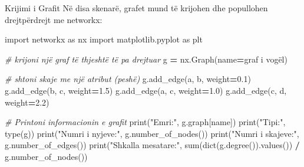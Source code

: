 \documentclass[
  ignorenonframetext,
]{beamer}
\newenvironment{Shaded}{\begin{snugshade}}{\end{snugshade}}
\newcommand{\BuiltInTok}[1]{#1}
\newcommand{\CommentTok}[1]{\textcolor[rgb]{0.56,0.35,0.01}{\textit{#1}}}
\newcommand{\FloatTok}[1]{\textcolor[rgb]{0.00,0.00,0.81}{#1}}
\newcommand{\ImportTok}[1]{#1}
\newcommand{\NormalTok}[1]{#1}
\newcommand{\OperatorTok}[1]{\textcolor[rgb]{0.81,0.36,0.00}{\textbf{#1}}}
\newcommand{\StringTok}[1]{\textcolor[rgb]{0.31,0.60,0.02}{#1}}
\begin{document}
\begin{frame}[fragile]{Krijimi i Grafit}
\protect\hypertarget{krijimi-i-grafit-1}{}
Në disa skenarë, grafet mund të krijohen dhe popullohen drejtpërdrejt me
networkx:


\begin{Shaded}
\begin{Highlighting}[]
\ImportTok{import}\NormalTok{ networkx }\ImportTok{as}\NormalTok{ nx}
\ImportTok{import}\NormalTok{ matplotlib.pyplot }\ImportTok{as}\NormalTok{ plt}

\CommentTok{\# krijoni një graf të thjeshtë të pa drejtuar}
\NormalTok{g }\OperatorTok{=}\NormalTok{ nx.Graph(name}\OperatorTok{=}\StringTok{\textquotesingle{}graf i vogël\textquotesingle{}}\NormalTok{)}

\CommentTok{\# shtoni skaje me një atribut (peshë)}
\NormalTok{g.add\_edge(}\StringTok{\textquotesingle{}a\textquotesingle{}}\NormalTok{, }\StringTok{\textquotesingle{}b\textquotesingle{}}\NormalTok{, weight}\OperatorTok{=}\FloatTok{0.1}\NormalTok{)}
\NormalTok{g.add\_edge(}\StringTok{\textquotesingle{}b\textquotesingle{}}\NormalTok{, }\StringTok{\textquotesingle{}c\textquotesingle{}}\NormalTok{, weight}\OperatorTok{=}\FloatTok{1.5}\NormalTok{)}
\NormalTok{g.add\_edge(}\StringTok{\textquotesingle{}a\textquotesingle{}}\NormalTok{, }\StringTok{\textquotesingle{}c\textquotesingle{}}\NormalTok{, weight}\OperatorTok{=}\FloatTok{1.0}\NormalTok{)}
\NormalTok{g.add\_edge(}\StringTok{\textquotesingle{}c\textquotesingle{}}\NormalTok{, }\StringTok{\textquotesingle{}d\textquotesingle{}}\NormalTok{, weight}\OperatorTok{=}\FloatTok{2.2}\NormalTok{)}

\CommentTok{\# Printoni informacionin e grafit}
\BuiltInTok{print}\NormalTok{(}\StringTok{"Emri:"}\NormalTok{, g.graph[}\StringTok{\textquotesingle{}name\textquotesingle{}}\NormalTok{])}
\BuiltInTok{print}\NormalTok{(}\StringTok{"Tipi:"}\NormalTok{, }\BuiltInTok{type}\NormalTok{(g))}
\BuiltInTok{print}\NormalTok{(}\StringTok{"Numri i nyjeve:"}\NormalTok{, g.number\_of\_nodes())}
\BuiltInTok{print}\NormalTok{(}\StringTok{"Numri i skajeve:"}\NormalTok{, g.number\_of\_edges())}
\BuiltInTok{print}\NormalTok{(}\StringTok{"Shkalla mesatare:"}\NormalTok{, }\BuiltInTok{sum}\NormalTok{(}\BuiltInTok{dict}\NormalTok{(g.degree()).values()) }\OperatorTok{/}\NormalTok{ g.number\_of\_nodes())}
\end{Highlighting}
\end{Shaded}
\end{frame}
\end{document}
